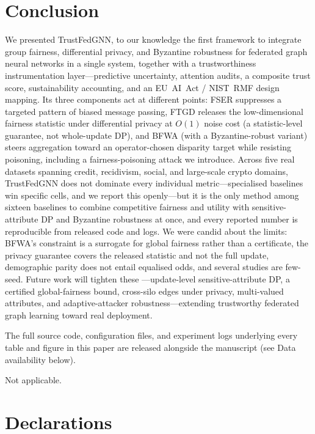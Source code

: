 \documentclass[pdflatex,sn-mathphys-num]{sn-jnl}
\theoremstyle{thmstyleone}%
\theoremstyle{thmstyletwo}%
\theoremstyle{thmstylethree}%
\begin{document}
\section{Conclusion}
\label{sec:conclusion}

We presented TrustFedGNN, to our knowledge the first framework to integrate
group fairness, differential privacy, and Byzantine robustness for federated
graph neural networks in a single system, together with a trustworthiness
instrumentation layer---predictive uncertainty, attention audits, a composite
trust score, sustainability accounting, and an EU~AI~Act / NIST~RMF design
mapping. Its three components act at different points: FSER suppresses a
targeted pattern of biased message passing, FTGD releases the low-dimensional
fairness statistic under differential privacy at $O(1)$ noise cost (a
statistic-level guarantee, not whole-update DP), and BFWA (with a
Byzantine-robust variant) steers aggregation toward an operator-chosen disparity
target while resisting poisoning, including a fairness-poisoning attack we
introduce. Across five real datasets spanning credit, recidivism, social, and
large-scale crypto domains, TrustFedGNN does not dominate every individual
metric---specialised baselines win specific cells, and we report this
openly---but it is the only method among sixteen baselines to combine
competitive fairness and utility with sensitive-attribute DP and Byzantine
robustness at once, and every reported number is reproducible from released code
and logs. We were candid about the limits: BFWA's constraint is a surrogate for
global fairness rather than a certificate, the privacy guarantee covers the
released statistic and not the full update, demographic parity does not entail
equalised odds, and several studies are few-seed. Future work will tighten these
---update-level sensitive-attribute DP, a certified global-fairness bound,
cross-silo edges under privacy, multi-valued attributes, and adaptive-attacker
robustness---extending trustworthy federated graph learning toward real
deployment.


\backmatter

The full source code, configuration files, and experiment logs underlying
every table and figure in this paper are released alongside the manuscript
(see Data availability below).

Not applicable.

\section*{Declarations}
\end{document}
